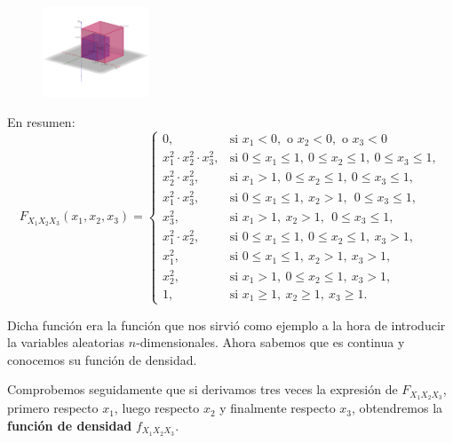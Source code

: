 \documentclass[]{book}
\begin{document}
\begin{figure}

{\centering \includegraphics[width=1.25in]{Images/Fx1x2x3pisox1x2} 

}

\end{figure}

En resumen:
\[
F_{X_1X_2X_3}(x_1,x_2,x_3)=\begin{cases}
0, & \mbox{si }x_1<0,\mbox{ o }x_2<0,\mbox{ o }x_3 <0\\
x_1^2\cdot x_2^2\cdot x_3^2, & \mbox{si }0\leq x_1\leq 1,\ 0\leq x_2\leq 1,\ 0\leq x_3\leq 1, \\
 x_2^2\cdot x_3^2, & \mbox{si }x_1> 1,\ 0\leq x_2\leq  1,\ 0\leq x_3\leq  1, \\
 x_1^2\cdot x_3^2, & \mbox{si }0\leq x_1\leq  1,\ x_2> 1,\ \ 0\leq x_3\leq  1, \\
 x_3^2, & \mbox{si }x_1> 1,\ x_2> 1,\ \ 0\leq x_3\leq  1, \\
 x_1^2\cdot x_2^2, & \mbox{si }0\leq x_1\leq  1,\ 0\leq x_2\leq  1,\ x_3> 1,\\
 x_1^2, & \mbox{si }0\leq x_1\leq  1,\ x_2 >  1,\ x_3> 1,\\
 x_2^2, & \mbox{si }x_1>1,\ 0\leq x_2\leq  1,\ x_3> 1,\\
1, & \mbox{si }x_1\geq 1,\ x_2\geq 1,\ x_3\geq 1.
\end{cases}
\]

Dicha función era la función que nos sirvió como ejemplo a la hora de introducir la variables aleatorias \(n\)-dimensionales. Ahora sabemos que es continua y conocemos su función de densidad.

Comprobemos seguidamente que si derivamos tres veces la expresión de \(F_{X_1X_2X_3}\), primero respecto \(x_1\), luego respecto \(x_2\) y finalmente respecto \(x_3\), obtendremos la \textbf{función de densidad} \(f_{X_1X_2X_3}\).
\end{document}

